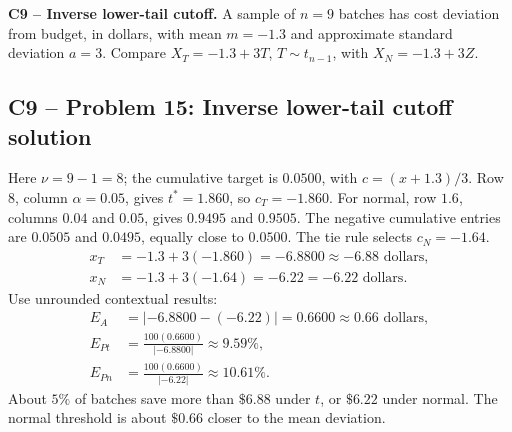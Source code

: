 {
\textbf{C9 -- Inverse lower-tail cutoff.} A sample of $n=9$ batches has cost deviation from budget, in dollars, with mean $m=-1.3$ and approximate standard deviation $a=3$. Compare $X_T=-1.3+3T$, $T\sim t_{n-1}$, with $X_N=-1.3+3Z$.
\label{sol:q15}
\subsection*{C9 -- Problem 15: Inverse lower-tail cutoff solution }
Here $\nu=9-1=8$; the cumulative target is $0.0500$, with $c=(x+1.3)/3$.
Row $8$, column $\alpha=0.05$, gives $t^*=1.860$, so $c_T=-1.860$.
For normal, row $1.6$, columns $0.04$ and $0.05$, gives $0.9495$ and $0.9505$.
The negative cumulative entries are $0.0505$ and $0.0495$, equally close to $0.0500$.
The tie rule selects $c_N=-1.64$.
\[
 \begin{aligned}
 x_T&=-1.3+3(-1.860)=-6.8800\approx\boxed{-6.88\text{ dollars}},\\
 x_N&=-1.3+3(-1.64)=-6.22=\boxed{-6.22\text{ dollars}}.
 \end{aligned}
\]
Use unrounded contextual results:
\[
 \begin{aligned}
 E_A&=|-6.8800-(-6.22)|=0.6600\approx\boxed{0.66\text{ dollars}},\\
 E_{Pt}&=\frac{100(0.6600)}{|-6.8800|}\approx\boxed{9.59\%},\\
 E_{Pn}&=\frac{100(0.6600)}{|-6.22|}\approx\boxed{10.61\%}.
 \end{aligned}
\]
About $5\%$ of batches save more than $\$6.88$ under $t$, or $\$6.22$ under normal.
The normal threshold is about $\$0.66$ closer to the mean deviation.
\secInicio[sec:q15]
}


